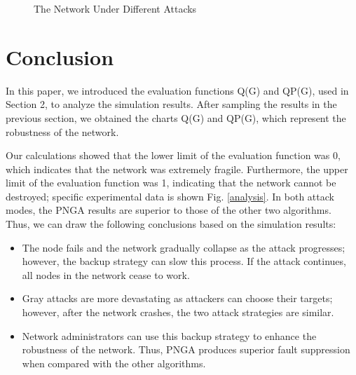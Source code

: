 \documentclass[AMA,STIX1COL]{WileyNJD-v2}
\begin{document}
\begin{figure}[htbp]
\caption{The Network Under Different Attacks} %
\label{Fault}
\end{figure}

\newpage


\section{Conclusion}
In this paper, we introduced the evaluation functions Q(G) and QP(G), used in Section 2, to analyze the simulation results. After sampling the results in the previous section, we obtained the charts Q(G) and QP(G), which represent the robustness of the network. 
\par Our calculations showed that the lower limit of the evaluation function was 0, which indicates that the network was extremely fragile. Furthermore, the upper limit of the evaluation function was 1, indicating that the network cannot be destroyed; specific experimental data is shown Fig. \ref{analysis}. In both attack modes, the PNGA results are superior to those of the other two algorithms. Thus, we can draw the following conclusions based on the simulation results:
\begin{itemize}
\item The node fails and the network gradually collapse as the attack progresses; however, the backup strategy can slow this process. If the attack continues, all nodes in the network cease to work.
\item Gray attacks are more devastating as attackers can choose their targets; however, after the network crashes, the two attack strategies are similar.
\item Network administrators can use this backup strategy to enhance the robustness of the network. Thus, PNGA produces superior fault suppression when compared with the other algorithms.

\end{itemize}
\end{document}
